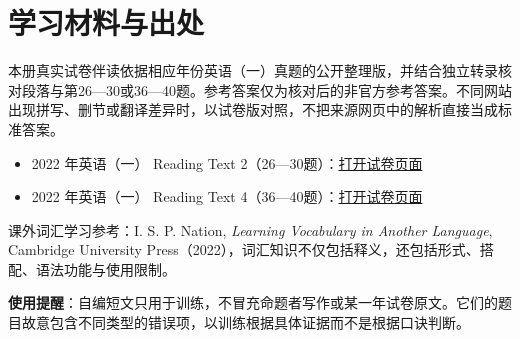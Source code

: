 \documentclass[
  11pt,
]{ctexart}
\begin{document}
\clearpage

\section{学习材料与出处}\label{ux5b66ux4e60ux6750ux6599ux4e0eux51faux5904}

本册真实试卷伴读依据相应年份英语（一）真题的公开整理版，并结合独立转录核对段落与第26---30或36---40题。参考答案仅为核对后的非官方参考答案。不同网站出现拼写、删节或翻译差异时，以试卷版对照，不把来源网页中的解析直接当成标准答案。

\begin{itemize}
\item
  2022 年英语（一） Reading Text
  2（26---30题）：\href{https://ac-wiki.org/general-skills/study/assets/2022-201.pdf}{打开试卷页面}
\item
  2022 年英语（一） Reading Text
  4（36---40题）：\href{https://ac-wiki.org/general-skills/study/assets/2022-201.pdf}{打开试卷页面}
\end{itemize}

课外词汇学习参考：I. S. P. Nation, \emph{Learning Vocabulary in Another
Language}, Cambridge University
Press（2022），词汇知识不仅包括释义，还包括形式、搭配、语法功能与使用限制。

\textbf{使用提醒}：自编短文只用于训练，不冒充命题者写作或某一年试卷原文。它们的题目故意包含不同类型的错误项，以训练根据具体证据而不是根据口诀判断。
\end{document}
